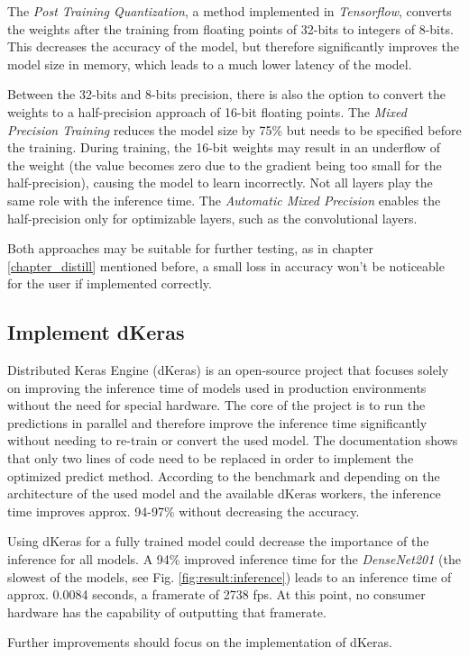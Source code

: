 The \textit{Post Training Quantization}\cite{postprec}, a method implemented in \textit{Tensorflow}, converts the weights after the training from floating points of 32-bits to integers of 8-bits. This decreases the accuracy of the model, but therefore significantly improves the model size in memory, which leads to a much lower latency of the model.

Between the 32-bits and 8-bits precision, there is also the option to convert the weights to a half-precision approach of 16-bit floating points. The \textit{Mixed Precision Training} reduces the model size by 75\% but needs to be specified before the training. During training, the 16-bit weights may result in an underflow of the weight (the value becomes zero due to the gradient being too small for the half-precision), causing the model to learn incorrectly. Not all layers play the same role with the inference time. The \textit{Automatic Mixed Precision} enables the half-precision only for optimizable layers, such as the convolutional layers.\cite{micikevicius2018mixed}

Both approaches may be suitable for further testing, as in chapter \ref{chapter_distill} mentioned before, a small loss in accuracy won't be noticeable for the user if implemented correctly.

\subsection{Implement dKeras}
Distributed Keras Engine (dKeras)\cite{dkeras} is an open-source project that focuses solely on improving the inference time of models used in production environments without the need for special hardware. The core of the project is to run the predictions in parallel and therefore improve the inference time significantly without needing to re-train or convert the used model. The documentation shows that only two lines of code need to be replaced in order to implement the optimized predict method. According to the benchmark and depending on the architecture of the used model and the available dKeras workers, the inference time improves approx. 94-97\% without decreasing the accuracy. 

Using dKeras for a fully trained model could decrease the importance of the inference for all models. A 94\% improved inference time for the \textit{DenseNet201} (the slowest of the models, see Fig. \ref{fig:result:inference}) leads to an inference time of approx. 0.0084 seconds, a framerate of 2738 fps. At this point, no consumer hardware has the capability of outputting that framerate.

Further improvements should focus on the implementation of dKeras.